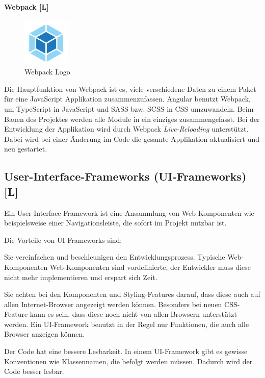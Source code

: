 \paragraph{Webpack [L]}
\begin{figure}
  \begin{center}
    \includegraphics[width=0.2\textwidth]{pics/webpack-logo.png}
   \caption{Webpack Logo}
  \end{center}
\end{figure}
Die Hauptfunktion von Webpack ist es, viele verschiedene Daten zu einem Paket für eine JavaScript Applikation zusammenzufassen.
Angular benutzt Webpack, um TypeScript in JavaScript und SASS bzw. SCSS in CSS umzuwandeln. Beim Bauen des Projektes werden alle Module in ein einziges zusammengefasst. Bei der Entwicklung der Applikation wird durch Webpack \emph{Live-Reloading} unterstützt. Dabei wird bei einer Änderung im Code die gesamte Applikation aktualisiert und neu gestartet. \cite{Webpack}

\subsection{User-Interface-Frameworks (UI-Frameworks) [L]}
Ein User-Interface-Framework ist eine Ansammlung von Web Komponenten wie beispielsweise einer Navigationsleiste, die sofort im Projekt nutzbar ist. \cite{CssFrameworkExplaination}


Die Vorteile von UI-Frameworks sind:
\begin{compactitem}
    \item Sie vereinfachen und beschleunigen den Entwicklungsprozess. Typische Web-Komponenten Web-Komponenten sind vordefinierte, der Entwickler muss diese nicht mehr implementieren und erspart sich Zeit. \cite{BestCSSFrameworksin2022}
    \item Sie achten bei den Komponenten und Styling-Features darauf, dass diese auch auf allen Internet-Browser angezeigt werden können.
    Besonders bei neuen CSS-Feature kann es sein, dass diese noch nicht von allen Browsern unterstützt werden. Ein UI-Framework benutzt in der Regel nur Funktionen, die auch alle Browser anzeigen können. \cite{CssFrameworkExplaination}
    \item Der Code hat eine bessere Lesbarkeit.
    In einem UI-Framework gibt es gewisse Konventionen wie Klassennamen, die befolgt werden müssen. Dadurch wird der Code besser lesbar. \cite{CssFrameworkExplaination}
\end{compactitem}


